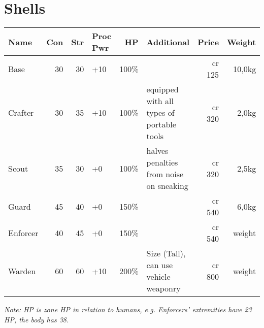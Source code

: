 \documentclass[12pt,a4paper]{book}
\begin{document}
	\section{Shells}
	\begin{tabularx}{\textwidth}{|l|r|r|l|r|X|r|r|}
		\hline
		Name & Con & Str & Proc Pwr & HP & Additional & Price & Weight \\ \hline
		Base & 30 & 30 & +10 & 100\% & & cr 125 & 10,0kg \\ \hline
		Crafter & 30 & 35 & +10 & 100\% & equipped with all types of portable tools & cr 320 & 2,0kg \\ \hline
		Scout & 35 & 30 & +0 & 100\% & halves penalties from noise on sneaking & cr 320 & 2,5kg \\ \hline
		Guard & 45 & 40 & +0 & 150\% & & cr 540 & 6,0kg \\ \hline
		Enforcer & 40 & 45 & +0 & 150\% & & cr 540 & weight \\ \hline
		Warden & 60 & 60 & +10 & 200\% & Size (Tall), can use vehicle weaponry & cr 800 & weight \\ \hline
	\end{tabularx}
	\textit{Note: HP is zone HP in relation to humans, e.g. Enforcers' extremities have 23 HP, the body has 38.}
\end{document}
